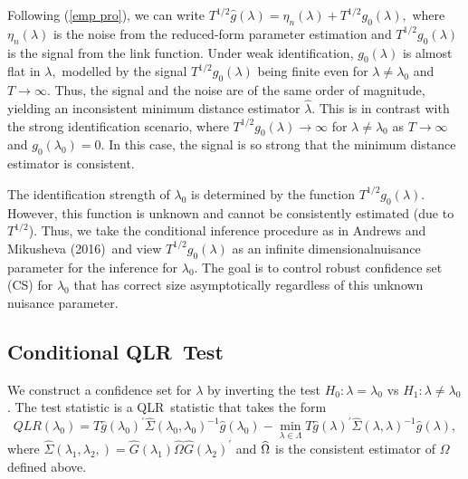 \documentclass[11pt]{article}
\begin{document}
Following (\ref{emp pro}), we can write $T^{1/2}\widehat{g}(\lambda )=\eta
_{n}(\lambda )+T^{1/2}g_{0}(\lambda ),$ where $\eta _{n}(\lambda )$ is the
noise from the reduced-form parameter estimation and $T^{1/2}g_{0}(\lambda )$
is the signal from the link function. Under weak identification, $%
g_{0}(\lambda )$ is almost flat in $\lambda ,$ modelled by the signal $%
T^{1/2}g_{0}(\lambda )$ being finite even for $\lambda \neq \lambda _{0}$
and $T\rightarrow \infty .$ Thus, the signal and the noise are of the same
order of magnitude, yielding an inconsistent minimum distance estimator $%
\widehat{\lambda }.$ This is in contrast with the strong identification
scenario, where $T^{1/2}g_{0}(\lambda )\rightarrow \infty $ for $\lambda
\neq \lambda _{0}$ as $T\rightarrow \infty $ and $g_{0}(\lambda _{0})=0.$ In
this case, the signal is so strong that the minimum distance estimator is
consistent.

The identification strength of $\lambda _{0}$ is determined by the function $%
T^{1/2}g_{0}(\lambda ).$ However, this function is unknown and cannot be
consistently estimated (due to $T^{1/2}$). Thus, we take the conditional
inference procedure as in Andrews and Mikusheva (2016)\ and view $%
T^{1/2}g_{0}(\lambda )$ as an infinite dimensionalnuisance parameter for the
inference for $\lambda _{0}$. The goal is to control robust confidence set
(CS) for $\lambda _{0}$ that has correct size asymptotically regardless of
this unknown nuisance parameter.

\subsection{Conditional QLR\ Test}

We construct a confidence set for $\lambda $ by inverting the test $%
H_{0}:\lambda =\lambda _{0}$ vs $H_{1}:\lambda \neq \lambda _{0}$. The test
statistic is a QLR\ statistic that takes the form%
\begin{equation}
QLR(\lambda _{0})=T\widehat{g}(\lambda _{0})^{\prime }\widehat{\Sigma }%
(\lambda _{0},\lambda _{0})^{-1}\widehat{g}(\lambda _{0})-\underset{\lambda
\in \Lambda }{\min }T\widehat{g}(\lambda )^{\prime }\widehat{\Sigma }%
(\lambda ,\lambda )^{-1}\widehat{g}(\lambda ),  \label{QLR stat}
\end{equation}%
where $\widehat{\Sigma }(\lambda _{1},\lambda _{2},)=\widehat{G}(\lambda
_{1})\widehat{\Omega }\widehat{G}(\lambda _{2})^{\prime }$ and $\widehat{%
\Omega }$ is the consistent estimator of $\Omega $ defined above$.$
\end{document}
